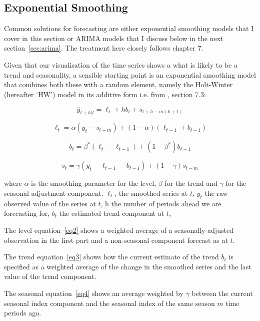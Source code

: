 \documentclass[9pt,technote]{IEEEtran}
\begin{document}
\subsection{Exponential Smoothing}
\label{sec:exp}

Common solutions for forecasting are either exponential smoothing models that I cover in this section or ARIMA models that I discuss below in the next section~\ref{sec:arima}.  The treatment here closely follows \cite{fpp2} chapter 7.  

Given that our visualisation of the time series shows a what is likely to be a trend and seasonality, a sensible starting point is an exponential smoothing model that combines both these with a random element, namely the Holt-Winter (hereafter `HW') model in its additive form i.e. from \cite{fpp2}, section 7.3: 

\begin{equation}
\hat{y}_{t+h|t}=\ell_{t} + hb_{t} + s_{t+h-m(k+1)}
\end{equation}

\begin{equation}
\label{eq2}
\ell_{t} = \alpha(y_t - s_{t-m}) + (1-\alpha)(\ell_{t-1} + b_{t-1})
\end{equation}

\begin{equation}
\label{eq3}
b_t = \beta^{*} (\ell_t - \ell_{t-1}) + (1-\beta^{*})b_{t-1}
\end{equation}

\begin{equation}
\label{eq4}
s_t = \gamma(y_t - \ell_{t-1} - b_{t-1}) + (1-\gamma)s_{t-m}
\end{equation}

where $\alpha$ is the smoothing parameter for the level, $\beta$ for the trend and $\gamma$ for the seasonal adjustment component.  $\ell_t$, the smoothed series at $t$, $y_t$ the raw observed value of the series at $t$, h the number of periods ahead we are forecasting for, $b_t$ the estimated trend component at $t$, 

The level equation~\ref{eq2} shows a weighted average of a seasonally-adjusted observation in the first part and a non-seasonal component forecast as at $t$.  

The trend equation~\ref{eq3} shows how the current estimate of the trend $b_t$ is specified as a weighted average of the change in the smoothed series and the last value of the trend component.  

The seasonal equation~\ref{eq4} shows an average weighted by $\gamma$ between the current seasonal index component and the seasonal index of the same season $m$ time periods ago.
\end{document}
